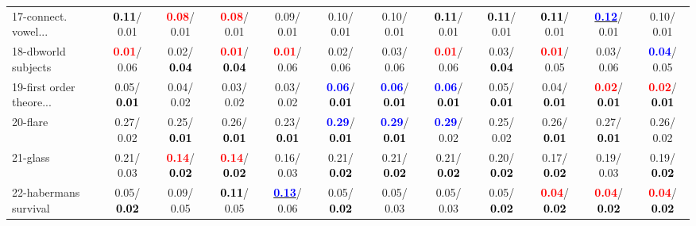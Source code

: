 \begin{table}[h]
\begin{center}
{\begin{tabular}{lc|c|c|c|c|c|c|c|c|c|c}
17-connect. vowel... & \textcolor{black}{\textbf{  0.11}}/  0.01 & \textcolor{red}{\textbf{  0.08}}/  0.01 & \textcolor{red}{\textbf{  0.08}}/  0.01 &   0.09/  0.01 &   0.10/  0.01 &   0.10/  0.01 & \textcolor{black}{\textbf{  0.11}}/  0.01 & \textcolor{black}{\textbf{  0.11}}/  0.01 & \textcolor{black}{\textbf{  0.11}}/  0.01 & \underline{\textcolor{blue}{\textbf{  0.12}}}/  0.01 &   0.10/  0.01 \\
18-dbworld subjects & \textcolor{red}{\textbf{  0.01}}/  0.06 &   0.02/\textcolor{black}{\textbf{  0.04}} & \textcolor{red}{\textbf{  0.01}}/\textcolor{black}{\textbf{  0.04}} & \textcolor{red}{\textbf{  0.01}}/  0.06 &   0.02/  0.06 &   0.03/  0.06 & \textcolor{red}{\textbf{  0.01}}/  0.06 &   0.03/\textcolor{black}{\textbf{  0.04}} & \textcolor{red}{\textbf{  0.01}}/  0.05 &   0.03/  0.06 & \textcolor{blue}{\textbf{  0.04}}/  0.05 \\
19-first order theore... &   0.05/\textcolor{black}{\textbf{  0.01}} &   0.04/  0.02 &   0.03/  0.02 &   0.03/  0.02 & \textcolor{blue}{\textbf{  0.06}}/\textcolor{black}{\textbf{  0.01}} & \textcolor{blue}{\textbf{  0.06}}/\textcolor{black}{\textbf{  0.01}} & \textcolor{blue}{\textbf{  0.06}}/\textcolor{black}{\textbf{  0.01}} &   0.05/\textcolor{black}{\textbf{  0.01}} &   0.04/\textcolor{black}{\textbf{  0.01}} & \textcolor{red}{\textbf{  0.02}}/\textcolor{black}{\textbf{  0.01}} & \textcolor{red}{\textbf{  0.02}}/\textcolor{black}{\textbf{  0.01}} \\
20-flare &   0.27/  0.02 &   0.25/\textcolor{black}{\textbf{  0.01}} &   0.26/\textcolor{black}{\textbf{  0.01}} &   0.23/\textcolor{black}{\textbf{  0.01}} & \textcolor{blue}{\textbf{  0.29}}/\textcolor{black}{\textbf{  0.01}} & \textcolor{blue}{\textbf{  0.29}}/\textcolor{black}{\textbf{  0.01}} & \textcolor{blue}{\textbf{  0.29}}/  0.02 &   0.25/  0.02 &   0.26/\textcolor{black}{\textbf{  0.01}} &   0.27/\textcolor{black}{\textbf{  0.01}} &   0.26/  0.02 \\
21-glass &   0.21/  0.03 & \textcolor{red}{\textbf{  0.14}}/\textcolor{black}{\textbf{  0.02}} & \textcolor{red}{\textbf{  0.14}}/\textcolor{black}{\textbf{  0.02}} &   0.16/  0.03 &   0.21/\textcolor{black}{\textbf{  0.02}} &   0.21/\textcolor{black}{\textbf{  0.02}} &   0.21/\textcolor{black}{\textbf{  0.02}} &   0.20/\textcolor{black}{\textbf{  0.02}} &   0.17/\textcolor{black}{\textbf{  0.02}} &   0.19/  0.03 &   0.19/\textcolor{black}{\textbf{  0.02}} \\ \hline
22-habermans survival &   0.05/\textcolor{black}{\textbf{  0.02}} &   0.09/  0.05 & \textcolor{black}{\textbf{  0.11}}/  0.05 & \underline{\textcolor{blue}{\textbf{  0.13}}}/  0.06 &   0.05/\textcolor{black}{\textbf{  0.02}} &   0.05/  0.03 &   0.05/  0.03 &   0.05/\textcolor{black}{\textbf{  0.02}} & \textcolor{red}{\textbf{  0.04}}/\textcolor{black}{\textbf{  0.02}} & \textcolor{red}{\textbf{  0.04}}/\textcolor{black}{\textbf{  0.02}} & \textcolor{red}{\textbf{  0.04}}/\textcolor{black}{\textbf{  0.02}} \\

\end{tabular}}
\end{center}
\end{table}
